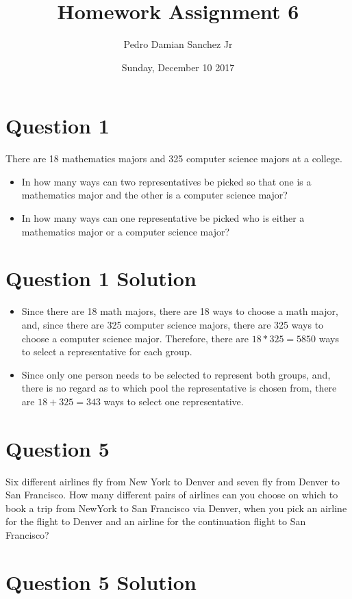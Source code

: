 \documentclass[11pt]{article}
\title{\bf Homework Assignment 6}
\date{Sunday, December 10 2017}
\author{Pedro Damian Sanchez Jr}
\begin{document}
\maketitle

\section*{Question 1}

There are 18 mathematics majors and 325 computer science majors at a college.

\begin{itemize}
\item In how many ways can two representatives be picked so that one is a mathematics major and the other is a computer science major?
\item In how many ways can one representative be picked who is either a mathematics major or a computer science major?
\end{itemize}

\section*{Question 1 Solution}

\begin{itemize}
\item Since there are 18 math majors, there are 18 ways to choose a math major, and, since there are 325 computer science majors, there are 325 ways to choose a computer science major. Therefore, there are $18*325=5850$ ways to select a representative for each group.
\item Since only one person needs to be selected to represent both groups, and, there is no regard as to which pool the representative is chosen from, there are $18+325=343$ ways to select one representative.
\end{itemize}

\section*{Question 5}

Six different airlines fly from New York to Denver and seven fly from Denver to San Francisco. How many different pairs of airlines can you choose on which to book a trip from NewYork to San Francisco via Denver, when you pick an airline for the flight to Denver and an airline for the continuation flight to San Francisco?

\section*{Question 5 Solution}
\end{document}
